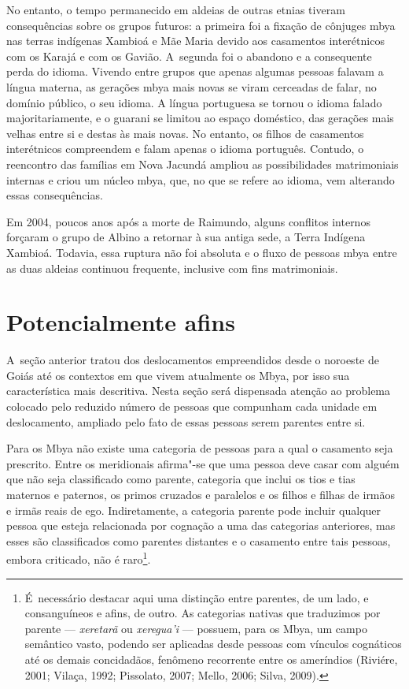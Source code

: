 No entanto, o tempo permanecido em aldeias de outras etnias tiveram
consequências sobre os grupos futuros: a primeira foi a fixação de
cônjuges mbya nas terras indígenas Xambioá e Mãe Maria devido aos
casamentos interétnicos com os Karajá e com os Gavião. A~segunda foi o
abandono e a consequente perda do idioma. Vivendo entre grupos que
apenas algumas pessoas falavam a língua materna, as gerações mbya mais
novas se viram cerceadas de falar, no domínio público, o seu idioma. A
língua portuguesa se tornou o idioma falado majoritariamente, e o
guarani se limitou ao espaço doméstico, das gerações mais velhas entre
si e destas às mais novas. No entanto, os filhos de casamentos
interétnicos compreendem e falam apenas o idioma português. Contudo, o
reencontro das famílias em Nova Jacundá ampliou as possibilidades
matrimoniais internas e criou um núcleo mbya, que, no que se refere ao
idioma, vem alterando essas consequências.

Em 2004, poucos anos após a morte de Raimundo, alguns conflitos internos
forçaram o grupo de Albino a retornar à sua antiga sede, a Terra
Indígena Xambioá. Todavia, essa ruptura não foi absoluta e o fluxo de
pessoas mbya entre as duas aldeias continuou frequente, inclusive com
fins matrimoniais.

\section{Potencialmente afins}

A~seção anterior tratou dos deslocamentos empreendidos desde o noroeste
de Goiás até os contextos em que vivem atualmente os Mbya, por isso sua
característica mais descritiva. Nesta seção será dispensada atenção ao
problema colocado pelo reduzido número de pessoas que compunham cada
unidade em deslocamento, ampliado pelo fato de essas pessoas serem
parentes entre si.

Para os Mbya não existe uma categoria de pessoas para a qual o casamento
seja prescrito. Entre os meridionais afirma"-se que uma pessoa deve
casar com alguém que não seja classificado como parente, categoria que
inclui os tios e tias maternos e paternos, os primos cruzados e
paralelos e os filhos e filhas de irmãos e irmãs reais de ego.
Indiretamente, a categoria parente pode incluir qualquer pessoa que
esteja relacionada por cognação a uma das categorias anteriores, mas
esses são classificados como parentes distantes e o casamento entre
tais pessoas, embora criticado, não é raro\footnote{É~necessário
destacar aqui uma distinção entre parentes, de um lado, e consanguíneos
e afins, de outro. As categorias nativas que traduzimos por parente ---
\emph{xeretarã} ou \emph{xeregua’i} --- possuem, para os Mbya, um campo semântico
vasto, podendo ser aplicadas desde pessoas com vínculos cognáticos até
os demais concidadãos, fenômeno recorrente entre os ameríndios
(Riviére, 2001; Vilaça, 1992; Pissolato, 2007; Mello, 2006; Silva,
2009).}. 

